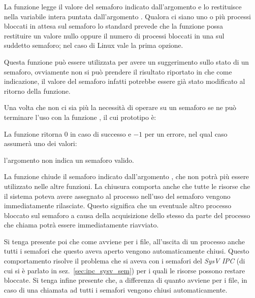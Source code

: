 La funzione legge il valore del semaforo indicato dall'argomento  e
lo restituisce nella variabile intera puntata dall'argomento
. Qualora ci siano uno o più processi bloccati in attesa sul
semaforo lo standard prevede che la funzione possa restituire un valore nullo
oppure il numero di processi bloccati in una  sul suddetto
semaforo; nel caso di Linux vale la prima opzione.

Questa funzione può essere utilizzata per avere un suggerimento sullo stato di
un semaforo, ovviamente non si può prendere il risultato riportato in
 che come indicazione, il valore del semaforo infatti potrebbe
essere già stato modificato al ritorno della funzione.


Una volta che non ci sia più la necessità di operare su un semaforo se ne può
terminare l'uso con la funzione , il cui prototipo è:

\begin{funcproto}{

}

{La funzione ritorna $0$ in caso di successo e $-1$ per un errore, nel qual
  caso  assumerà uno dei valori:
  \begin{errlist}
    \item[\errcode{EINVAL}] l'argomento  non indica un semaforo
      valido.
  \end{errlist}
}  
\end{funcproto}

La funzione chiude il semaforo indicato dall'argomento , che non
potrà più essere utilizzato nelle altre funzioni. La chiusura comporta anche
che tutte le risorse che il sistema poteva avere assegnato al processo
nell'uso del semaforo vengono immediatamente rilasciate. Questo significa che
un eventuale altro processo bloccato sul semaforo a causa della acquisizione
dello stesso da parte del processo che chiama  potrà essere
immediatamente riavviato.

Si tenga presente poi che come avviene per i file, all'uscita di un processo
anche tutti i semafori che questo aveva aperto vengono automaticamente chiusi.
Questo comportamento risolve il problema che si aveva con i semafori del
\textit{SysV IPC} (di cui si è parlato in sez.~\ref{sec:ipc_sysv_sem}) per i
quali le risorse possono restare bloccate. Si tenga infine presente che, a
differenza di quanto avviene per i file, in caso di una chiamata ad
 tutti i semafori vengono chiusi automaticamente.

